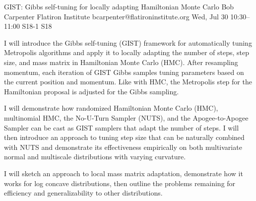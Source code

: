 \begin{talk}
  {GIST: Gibbs self-tuning for locally adapting Hamiltonian Monte Carlo}%
  {Bob Carpenter}%
  {Flatiron Institute}%
  {bcarpenter@flatironinstitute.org}%
  {}%
  {}%
  {Wed, Jul 30 10:30--11:00}%
  {S18-1}%
  {S18}%
  {}%
  
    
   
I will introduce the Gibbs self-tuning (GIST) framework for automatically tuning Metropolis algorithms and apply it to locally adapting the number of steps, step size, and mass matrix in Hamiltonian Monte Carlo (HMC).  After resampling momentum, each iteration of GIST Gibbs samples tuning parameters based on the current position and momentum.  Like with HMC, the Metropolis step for the Hamiltonian proposal is adjusted for the Gibbs sampling.

I will demonstrate how randomized Hamiltonian Monte Carlo (HMC), multinomial HMC, the No-U-Turn Sampler (NUTS), and the Apogee-to-Apogee Sampler can be cast as GIST samplers that adapt the number of steps.  I will then introduce an approach to tuning step size that can be naturally combined with NUTS and demonstrate its effectiveness empirically on both multivariate normal and multiscale distributions with varying curvature.  

I will sketch an approach to local mass matrix adaptation, demonstrate how it works for log concave distributions, then outline the problems remaining for efficiency and generalizability to other distributions.

\end{talk}

